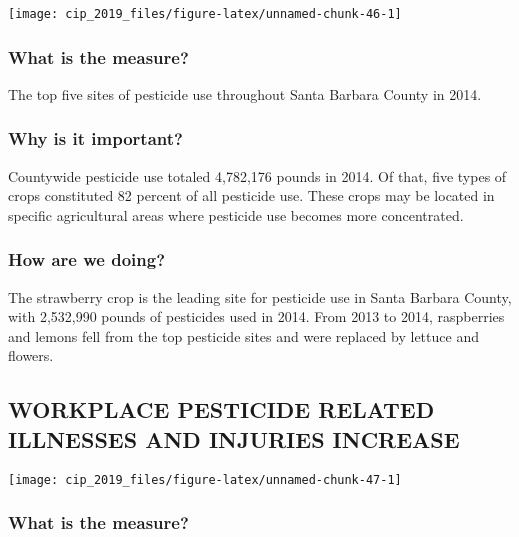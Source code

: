 \documentclass[]{book}
\theoremstyle{definition}
\theoremstyle{definition}
\theoremstyle{definition}
\theoremstyle{remark}
\begin{document}
\texttt{[image: cip\_2019\_files/figure-latex/unnamed-chunk-46-1]}

\subsubsection*{What is the measure?}\label{what-is-the-measure-21}

The top five sites of pesticide use throughout Santa Barbara County in
2014.

\subsubsection*{Why is it important?}\label{why-is-it-important-20}

Countywide pesticide use totaled 4,782,176 pounds in 2014. Of that, five
types of crops constituted 82 percent of all pesticide use. These crops
may be located in specific agricultural areas where pesticide use
becomes more concentrated.

\subsubsection*{How are we doing?}\label{how-are-we-doing-27}

The strawberry crop is the leading site for pesticide use in Santa
Barbara County, with 2,532,990 pounds of pesticides used in 2014. From
2013 to 2014, raspberries and lemons fell from the top pesticide sites
and were replaced by lettuce and flowers.

\subsection*{WORKPLACE PESTICIDE RELATED ILLNESSES AND INJURIES
INCREASE}\label{workplace-pesticide-related-illnesses-and-injuries-increase}

\texttt{[image: cip\_2019\_files/figure-latex/unnamed-chunk-47-1]}

\subsubsection*{What is the measure?}\label{what-is-the-measure-22}
\end{document}
